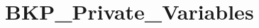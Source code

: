 \hypertarget{group___b_k_p___private___variables}{}\section{B\+K\+P\+\_\+\+Private\+\_\+\+Variables}
\label{group___b_k_p___private___variables}
